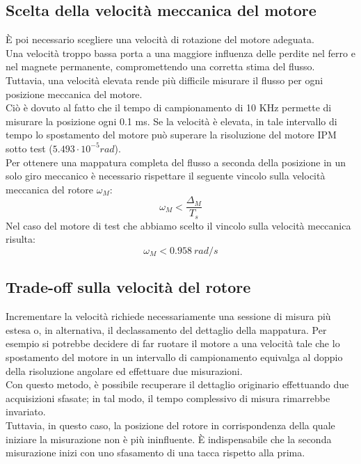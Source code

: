 \subsection{Scelta della velocità meccanica del motore}
È poi necessario scegliere una velocità di rotazione del motore adeguata.\\
Una velocità troppo bassa porta a una maggiore influenza delle perdite nel ferro e nel magnete permanente, compromettendo una corretta stima del flusso. Tuttavia, una velocità elevata rende più difficile misurare il flusso per ogni posizione meccanica del motore. \\Ciò è dovuto al fatto che il tempo di campionamento di 10 KHz permette di misurare la posizione ogni 0.1 ms. Se la velocità è elevata, in tale intervallo di tempo lo spostamento del motore può superare la risoluzione del motore IPM sotto test ($5.493 \cdot 10^{-5} rad$).\\
Per ottenere una mappatura completa del flusso a seconda della posizione in un solo giro meccanico è necessario rispettare il seguente vincolo sulla velocità meccanica del rotore $\omega_M$:
\begin{equation}
\omega_M<\frac{\Delta_M}{T_s}  
\end{equation}
Nel caso del motore di test che abbiamo scelto il vincolo sulla velocità meccanica risulta:
\begin{equation}
\omega_M<0.958\ rad/s
\end{equation}




\subsection{Trade-off sulla velocità del rotore}
Incrementare la velocità richiede necessariamente una sessione di misura più estesa o, in alternativa, il declassamento del dettaglio della mappatura.
Per esempio si potrebbe decidere di far ruotare il motore a una velocità tale che lo spostamento del motore in un intervallo di campionamento equivalga al doppio della risoluzione angolare ed effettuare due misurazioni. \\
Con questo metodo, è possibile recuperare il dettaglio originario effettuando due acquisizioni sfasate; in tal modo, il tempo complessivo di misura rimarrebbe invariato.\\
Tuttavia, in questo caso, la posizione del rotore in corrispondenza della quale iniziare la misurazione non è più ininfluente. È indispensabile che la seconda misurazione inizi con uno sfasamento di una tacca rispetto alla prima.

